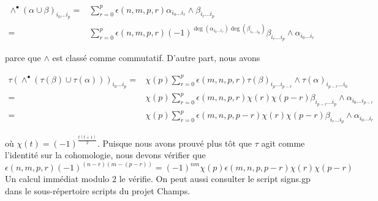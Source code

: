 \begin{align*}
\wedge^\bullet(\alpha \cup \beta)_{i_0 \ldots i_p}
= &
\sum\nolimits_{r = 0}^p
\epsilon(n, m, p, r)
\alpha_{i_0 \ldots i_r} \wedge \beta_{i_r \ldots i_p} \\
= &
\sum\nolimits_{r = 0}^p
\epsilon(n, m, p, r)
(-1)^{\deg(\alpha_{i_0 \ldots i_r})\deg(\beta_{i_r \ldots i_p})}
\beta_{i_r \ldots i_p} \wedge \alpha_{i_0 \ldots i_r}
\end{align*}

parce que $\wedge$ est classé comme commutatif. D'autre part, nous avons

\begin{align*}
\tau(\wedge^\bullet(\tau(\beta) \cup \tau(\alpha)))_{i_0 \ldots i_p}
= &
\chi(p)
\sum\nolimits_{r = 0}^p
\epsilon(m, n, p, r)
\tau(\beta)_{i_p \ldots i_{p - r}} \wedge \tau(\alpha)_{i_{p - r} \ldots i_0}
\\
= &
\chi(p)
\sum\nolimits_{r = 0}^p
\epsilon(m, n, p, r) \chi(r) \chi(p - r)
\beta_{i_{p - r} \ldots i_p} \wedge \alpha_{i_0 \ldots i_{p - r}}
\\
= &
\chi(p)
\sum\nolimits_{r = 0}^p
\epsilon(m, n, p, p - r) \chi(r) \chi(p - r)
\beta_{i_r \ldots i_p} \wedge \alpha_{i_0 \ldots i_r}
\end{align*}

où $\chi(t) = (-1)^{\frac{t(t + 1)}{2}}$. Puisque nous avons prouvé plus tôt que
$\tau$ agit comme l'identité sur la cohomologie, nous devons vérifier que
$$
\epsilon(n, m, p, r)
(-1)^{(n - r)(m - (p - r))}
=
(-1)^{nm} \chi(p)\epsilon(m, n, p, p - r) \chi(r) \chi(p - r)
$$
Un calcul immédiat modulo $2$ le vérifie. On peut aussi consulter le script signs.gp dans le sous-répertoire scripts du projet Champs.


